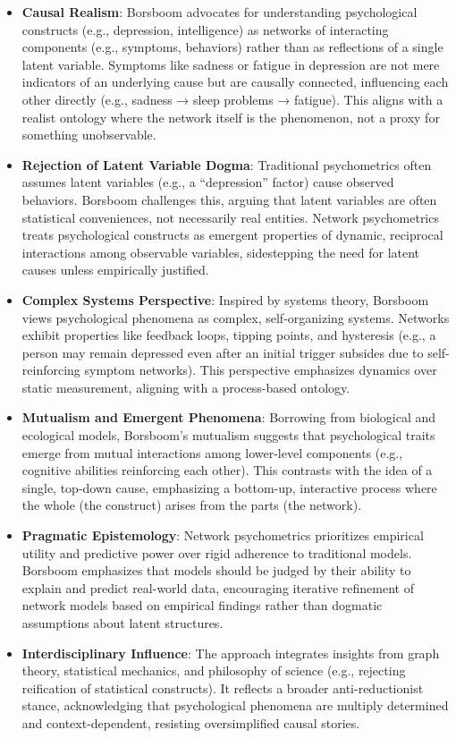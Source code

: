 \documentclass[
  jou,
  floatsintext,
  longtable,
  nolmodern,
  notxfonts,
  notimes,
  colorlinks=true,linkcolor=blue,citecolor=blue,urlcolor=blue]{apa7}
\begin{document}
\begin{itemize}
\item
  \textbf{Causal Realism}: Borsboom advocates for understanding
  psychological constructs (e.g., depression, intelligence) as networks
  of interacting components (e.g., symptoms, behaviors) rather than as
  reflections of a single latent variable. Symptoms like sadness or
  fatigue in depression are not mere indicators of an underlying cause
  but are causally connected, influencing each other directly (e.g.,
  sadness → sleep problems → fatigue). This aligns with a realist
  ontology where the network itself is the phenomenon, not a proxy for
  something unobservable.
\item
  \textbf{Rejection of Latent Variable Dogma}: Traditional psychometrics
  often assumes latent variables (e.g., a ``depression'' factor) cause
  observed behaviors. Borsboom challenges this, arguing that latent
  variables are often statistical conveniences, not necessarily real
  entities. Network psychometrics treats psychological constructs as
  emergent properties of dynamic, reciprocal interactions among
  observable variables, sidestepping the need for latent causes unless
  empirically justified.
\item
  \textbf{Complex Systems Perspective}: Inspired by systems theory,
  Borsboom views psychological phenomena as complex, self-organizing
  systems. Networks exhibit properties like feedback loops, tipping
  points, and hysteresis (e.g., a person may remain depressed even after
  an initial trigger subsides due to self-reinforcing symptom networks).
  This perspective emphasizes dynamics over static measurement, aligning
  with a process-based ontology.
\item
  \textbf{Mutualism and Emergent Phenomena}: Borrowing from biological
  and ecological models, Borsboom's mutualism suggests that
  psychological traits emerge from mutual interactions among lower-level
  components (e.g., cognitive abilities reinforcing each other). This
  contrasts with the idea of a single, top-down cause, emphasizing a
  bottom-up, interactive process where the whole (the construct) arises
  from the parts (the network).
\item
  \textbf{Pragmatic Epistemology}: Network psychometrics prioritizes
  empirical utility and predictive power over rigid adherence to
  traditional models. Borsboom emphasizes that models should be judged
  by their ability to explain and predict real-world data, encouraging
  iterative refinement of network models based on empirical findings
  rather than dogmatic assumptions about latent structures.
\item
  \textbf{Interdisciplinary Influence}: The approach integrates insights
  from graph theory, statistical mechanics, and philosophy of science
  (e.g., rejecting reification of statistical constructs). It reflects a
  broader anti-reductionist stance, acknowledging that psychological
  phenomena are multiply determined and context-dependent, resisting
  oversimplified causal stories.
\end{itemize}
\end{document}
